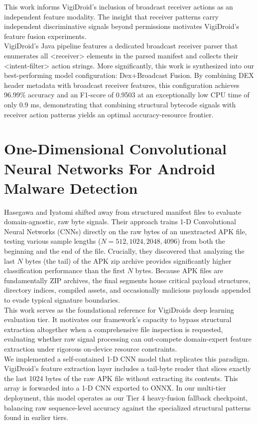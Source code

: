 This work informs VigiDroid’s inclusion of broadcast receiver actions as an independent feature modality. The insight that receiver patterns carry independent discriminative signals beyond permissions motivates VigiDroid's feature fusion experiments.\\

 VigiDroid's Java pipeline features a dedicated broadcast receiver parser that enumerates all <receiver> elements in the parsed manifest and collects their <intent-filter> action strings. More significantly, this work is synthesized into our best-performing model configuration: Dex+Broadcast Fusion. By combining DEX header metadata with broadcast receiver features, this configuration achieves 96.99\% accuracy and an F1-score of 0.9503 at an exceptionally low CPU time of only 0.9 ms, demonstrating that combining structural bytecode signals with receiver action patterns yields an optimal accuracy-resource frontier.

\section{One-Dimensional Convolutional Neural Networks For Android Malware Detection}
 Hasegawa and Iyatomi \cite{byteCNN} shifted away from structured manifest files to evaluate domain-agnostic, raw byte signals. Their approach trains 1-D Convolutional Neural Networks (CNNs) directly on the raw bytes of an unextracted APK file, testing various sample lengths ($N = 512, 1024, 2048, 4096$) from both the beginning and the end of the file. Crucially, they discovered that analyzing the last $N$ bytes (the tail) of the APK zip archive provides significantly higher classification performance than the first $N$ bytes. Because APK files are fundamentally ZIP archives, the final segments house critical payload structures, directory indices, compiled assets, and occasionally malicious payloads appended to evade typical signature boundaries.\\

 This work serves as the foundational reference for VigiDroids deep learning evaluation tier. It motivates our framework's capacity to bypass structural extraction altogether when a comprehensive file inspection is requested, evaluating whether raw signal processing can out-compete domain-expert feature extraction under rigorous on-device resource constraints.\\ We implemented a self-contained 1-D CNN model that replicates this paradigm. VigiDroid's feature extraction layer includes a tail-byte reader that slices exactly the last 1024 bytes of the raw APK file without extracting its contents. This array is forwarded into a 1-D CNN exported to ONNX. In our multi-tier deployment, this model operates as our Tier 4 heavy-fusion fallback checkpoint, balancing raw sequence-level accuracy against the specialized structural patterns found in earlier tiers.
